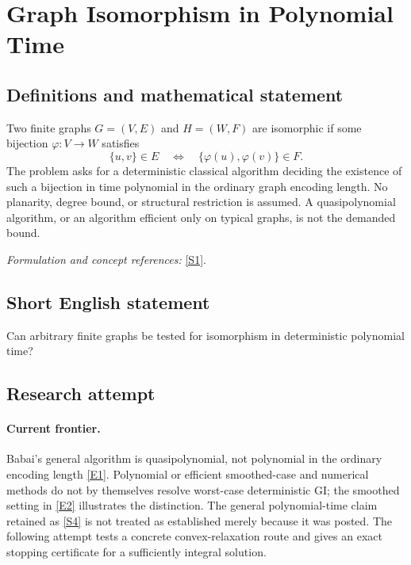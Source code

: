 \documentclass[11pt,a4paper]{article}
\numberwithin{equation}{section}
\newcommand{\sref}[2]{\hyperlink{source:#1:#2}{[S#2]}}
\newcommand{\eref}[2]{\hyperlink{extra:#1:#2}{[E#2]}}
\newif\ifshowcatalogue
\newcommand{\cataloguescope}[1]{\ifshowcatalogue
 \paragraph{Exact scope in the supplied catalogue.}
 \begin{quote}\small #1\end{quote}\fi}
\begin{document}
\setcounter{section}{0}
\section*{\texorpdfstring{Graph Isomorphism in Polynomial Time}{Graph Isomorphism in Polynomial Time}}\label{30006715}
\subsection{Definitions and mathematical statement}
Two finite graphs $G=(V,E)$ and $H=(W,F)$ are isomorphic if some bijection $\varphi:V\to W$ satisfies
\[
 \{u,v\}\in E\quad\Longleftrightarrow\quad\{\varphi(u),\varphi(v)\}\in F.
\]
The problem asks for a deterministic classical algorithm deciding the existence of such a bijection in time polynomial in the ordinary graph encoding length. No planarity, degree bound, or structural restriction is assumed. A quasipolynomial algorithm, or an algorithm efficient only on typical graphs, is not the demanded bound.
\par\smallskip\textit{Formulation and concept references:} \sref{30006715}{1}.
\cataloguescope{Determine whether the graph isomorphism problem for general finite graphs is decidable by a deterministic classical Turing machine in polynomial time.}
\subsection{Short English statement}
Can arbitrary finite graphs be tested for isomorphism in deterministic polynomial time?
\subsection{Research attempt}

\paragraph{Current frontier.}
Babai's general algorithm is quasipolynomial, not polynomial in the ordinary
encoding length \eref{30006715}{1}. Polynomial or efficient smoothed-case and
numerical methods do not by themselves resolve worst-case deterministic
GI; the smoothed setting in \eref{30006715}{2} illustrates the distinction.
The general polynomial-time claim retained as \sref{30006715}{4} is not treated
as established merely because it was posted. The following attempt tests
a concrete convex-relaxation route and gives an exact stopping certificate
for a sufficiently integral solution.
\end{document}
